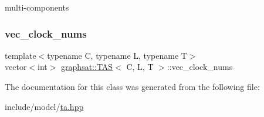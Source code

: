 multi-\/components \mbox{\label{classgraphsat_1_1_t_a_s_a8ee222cb29cb149323caee831bc3fc9c}} 
\subsubsection{\texorpdfstring{vec\_clock\_nums}{vec\_clock\_nums}}
{\footnotesize\ttfamily template$<$typename C, typename L, typename T$>$ \\
vector$<$int$>$ \mbox{\hyperlink{classgraphsat_1_1_t_a_s}{graphsat\+::\+T\+AS}}$<$ C, L, T $>$\+::vec\+\_\+clock\+\_\+nums\hspace{0.3cm}{\ttfamily [private]}}



The documentation for this class was generated from the following file\+:\begin{DoxyCompactItemize}
\item 
include/model/\mbox{\hyperlink{ta_8hpp}{ta.\+hpp}}\end{DoxyCompactItemize}
